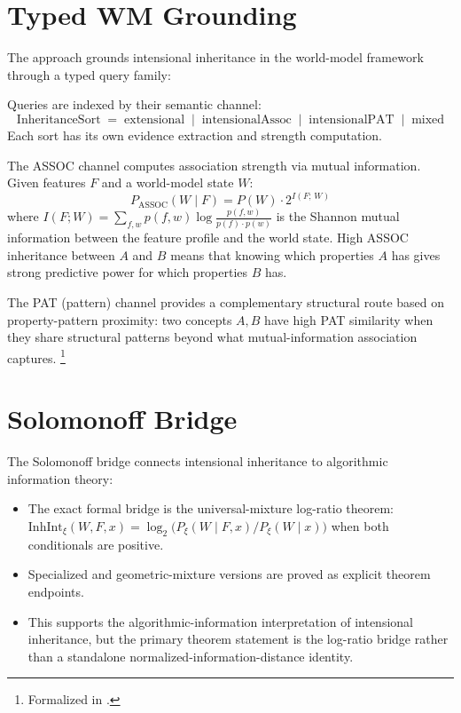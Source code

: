 \documentclass[11pt,openany]{report}
\begin{document}
\section{Typed WM Grounding}

The \xiPLN{} approach grounds intensional inheritance in the world-model
framework through a typed query family:

\begin{definition}
Queries are indexed by their semantic channel:
\[
  \mathrm{InheritanceSort} \;=\;
  \mathrm{extensional} \;\mid\;
  \mathrm{intensionalAssoc} \;\mid\;
  \mathrm{intensionalPAT} \;\mid\;
  \mathrm{mixed}
\]
Each sort has its own evidence extraction and strength computation.
\end{definition}

The ASSOC channel computes association strength via mutual information.
Given features $F$ and a world-model state $W$:
\[
  P_{\mathrm{ASSOC}}(W \mid F) = P(W) \cdot 2^{I(F;\,W)}
\]
where $I(F; W) = \sum_{f,w} p(f,w) \log \frac{p(f,w)}{p(f) \cdot p(w)}$
is the Shannon mutual information between the feature profile and the
world state.  High ASSOC inheritance between $A$ and $B$ means that
knowing which properties $A$ has gives strong predictive power for which
properties $B$ has.

The PAT (pattern) channel provides a complementary structural route based
on property-pattern proximity: two concepts $A, B$ have high PAT similarity
when they share structural patterns beyond what mutual-information association
captures.%
\footnote{Formalized in .}

\section{Solomonoff Bridge}

The Solomonoff bridge connects intensional inheritance to algorithmic
information theory:
\begin{itemize}
\item The exact formal bridge is the universal-mixture log-ratio theorem:
  $\mathrm{InhInt}_{\xi}(W,F,x)
  = \log_2\!\bigl(P_{\xi}(W \mid F,x) / P_{\xi}(W \mid x)\bigr)$
  when both conditionals are positive.
\item Specialized  and geometric-mixture versions are
  proved as explicit theorem endpoints.
\item This supports the algorithmic-information interpretation of
  intensional inheritance, but the primary theorem statement is the
  log-ratio bridge rather than a standalone normalized-information-distance
  identity.
\end{itemize}
\end{document}
